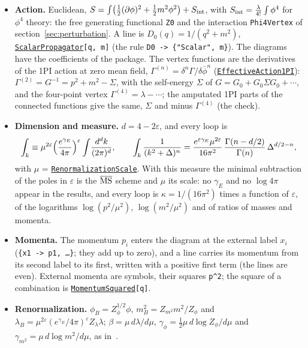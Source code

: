 \documentclass[11pt,a4paper]{article}
\newcommand{\pkg}[1]{\texttt{#1}}
\newcommand{\fnref}[1]{\hyperref[fn:#1]{\pkg{#1}}}
\begin{document}
\begin{itemize}
\item \textbf{Action.} Euclidean, $S=\int\bigl(\frac12(\partial\phi)^2+\frac12m^2\phi^2\bigr)+S_{\rm int}$, with
  $S_{\rm int}=\frac{\lambda}{4!}\int\phi^4$ for $\phi^4$ theory: the free generating functional \pkg{Z0} and the
  interaction \pkg{Phi4Vertex} of section~\ref{sec:perturbation}. A line is $D_0(q)=1/(q^2+m^2)$,
  \fnref{ScalarPropagator}\pkg{[q, m]} (the rule \pkg{D0 -> \{"Scalar", m\}}). The diagrams have the coefficients of the
  package. The vertex functions are the derivatives of the 1PI action at zero mean field,
  $\Gamma^{(n)}=\delta^n\Gamma/\delta\bar\phi^n$ (\fnref{EffectiveAction1PI}): $\Gamma^{(2)}=G^{-1}=p^2+m^2-\Sigma$, with the
  self-energy $\Sigma$ of $G=G_0+G_0\Sigma G_0+\cdots$, and the four-point vertex $\Gamma^{(4)}=\lambda-\cdots$; the amputated
  1PI parts of the connected functions give the same, $\Sigma$ and minus $\Gamma^{(4)}$ (the check).
\item \textbf{Dimension and measure.} $d=4-2\varepsilon$, and every loop is
  \[
  \int_k\equiv\mu^{2\varepsilon}\Bigl(\frac{e^{\gamma_E}}{4\pi}\Bigr)^{\varepsilon}\int\!\frac{d^dk}{(2\pi)^d},\qquad
  \int_k\frac{1}{(k^2+\Delta)^n}=\frac{e^{\varepsilon\gamma_E}\mu^{2\varepsilon}}{16\pi^2}\,\frac{\Gamma(n-d/2)}{\Gamma(n)}\,
  \Delta^{d/2-n},
  \]
  with $\mu$ = \fnref{RenormalizationScale}. With this measure the minimal subtraction of the poles in $\varepsilon$ is the
  $\overline{\rm MS}$ scheme and $\mu$ its scale: no $\gamma_E$ and no $\log4\pi$ appear in the results, and every loop
  is $\kappa=1/(16\pi^2)$ times a function of $\varepsilon$, of the logarithms $\log(p^2/\mu^2)$, $\log(m^2/\mu^2)$ and of
  ratios of masses and momenta.
\item \textbf{Momenta.} The momentum $p_i$ enters the diagram at the external label $x_i$ (\pkg{\{x1 -> p1, \dots\}}; they
  add up to zero), and a line carries its momentum from its second label to its first, written with a positive first
  term (the lines are even). External momenta are symbols, their squares \pkg{p\^{}2}; the square of a combination is
  \fnref{MomentumSquared}\pkg{[q]}.
\item \textbf{Renormalization.} $\phi_B=Z_\phi^{1/2}\phi$, $m_B^2=Z_{m^2}m^2/Z_\phi$ and
  $\lambda_B=\mu^{2\varepsilon}(e^{\gamma_E}/4\pi)^{\varepsilon}Z_\lambda\lambda$; $\beta=\mu\,d\lambda/d\mu$,
  $\gamma_\phi=\frac12\mu\,d\log Z_\phi/d\mu$ and $\gamma_{m^2}=\mu\,d\log m^2/d\mu$, as
  in~\cite{PeskinSchroeder,ZinnJustin2002,KleinertSchulteFrohlinde2001}.
\end{itemize}
\end{document}
